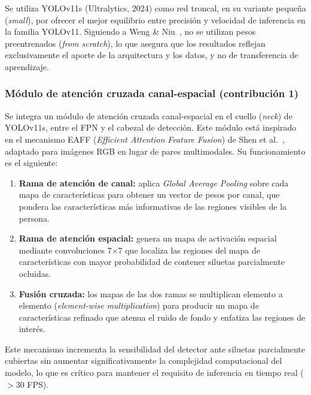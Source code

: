 Se utiliza YOLOv11s (Ultralytics, 2024) como red troncal, en su
variante peque\~{n}a (\textit{small}), por ofrecer el mejor
equilibrio entre precisi\'on y velocidad de inferencia en la
familia YOLOv11. Siguiendo a Weng \&
Niu~\cite{ElsYolo2025}, no se utilizan pesos preentrenados
(\textit{from scratch}), lo que asegura que los resultados
reflejan exclusivamente el aporte de la arquitectura y los datos,
y no de transferencia de aprendizaje.

\subsubsection{M\'odulo de atenci\'on cruzada canal-espacial
(contribuci\'on 1)}

Se integra un m\'odulo de atenci\'on cruzada canal-espacial en el
cuello (\textit{neck}) de YOLOv11s, entre el FPN y el cabezal de
detecci\'on. Este m\'odulo est\'a inspirado en el mecanismo EAFF
(\textit{Efficient Attention Feature Fusion}) de Shen et
al.~\cite{Shen2025}, adaptado para im\'agenes RGB en lugar de
pares multimodales. Su funcionamiento es el siguiente:

\begin{enumerate}
  \item \textbf{Rama de atenci\'on de canal:} aplica
        \textit{Global Average Pooling} sobre cada mapa de
        caracter\'{i}sticas para obtener un vector de pesos por
        canal, que pondera las caracter\'{i}sticas m\'as informativas
        de las regiones visibles de la persona.
  \item \textbf{Rama de atenci\'on espacial:} genera un mapa de
        activaci\'on espacial mediante convoluciones 7$\times$7
        que localiza las regiones del mapa de caracter\'{i}sticas
        con mayor probabilidad de contener siluetas parcialmente
        ocluidas.
  \item \textbf{Fusi\'on cruzada:} los mapas de las dos ramas se
        multiplican elemento a elemento (\textit{element-wise
        multiplication}) para producir un mapa de
        caracter\'{i}sticas refinado que atenua el ruido de fondo
        y enfatiza las regiones de inter\'es.
\end{enumerate}

Este mecanismo incrementa la sensibilidad del detector ante
siluetas parcialmente cubiertas sin aumentar significativamente
la complejidad computacional del modelo, lo que es
cr\'{i}tico para mantener el requisito de inferencia en tiempo
real ($>$30 FPS).

